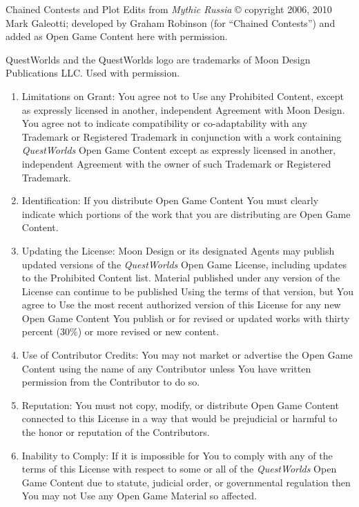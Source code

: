 \documentclass[
]{article}
\begin{document}
Chained Contests and Plot Edits from \emph{Mythic Russia} © copyright
2006, 2010 Mark Galeotti; developed by Graham Robinson (for ``Chained
Contests'') and added as Open Game Content here with permission.

QuestWorlds and the QuestWorlds logo are trademarks of Moon Design
Publications LLC. Used with permission.

\begin{enumerate}
\def\labelenumi{\arabic{enumi}.}
\setcounter{enumi}{7}
\item
  Limitations on Grant: You agree not to Use any Prohibited Content,
  except as expressly licensed in another, independent Agreement with
  Moon Design. You agree not to indicate compatibility or
  co-adaptability with any Trademark or Registered Trademark in
  conjunction with a work containing \emph{QuestWorlds} Open Game
  Content except as expressly licensed in another, independent Agreement
  with the owner of such Trademark or Registered Trademark.
\item
  Identification: If you distribute Open Game Content You must clearly
  indicate which portions of the work that you are distributing are Open
  Game Content.
\item
  Updating the License: Moon Design or its designated Agents may publish
  updated versions of the \emph{QuestWorlds} Open Game License,
  including updates to the Prohibited Content list. Material published
  under any version of the License can continue to be published Using
  the terms of that version, but You agree to Use the most recent
  authorized version of this License for any new Open Game Content You
  publish or for revised or updated works with thirty percent (30\%) or
  more revised or new content.
\item
  Use of Contributor Credits: You may not market or advertise the Open
  Game Content using the name of any Contributor unless You have written
  permission from the Contributor to do so.
\item
  Reputation: You must not copy, modify, or distribute Open Game Content
  connected to this License in a way that would be prejudicial or
  harmful to the honor or reputation of the Contributors.
\item
  Inability to Comply: If it is impossible for You to comply with any of
  the terms of this License with respect to some or all of the
  \emph{QuestWorlds} Open Game Content due to statute, judicial order,
  or governmental regulation then You may not Use any Open Game Material
  so affected.
\end{enumerate}
\end{document}
